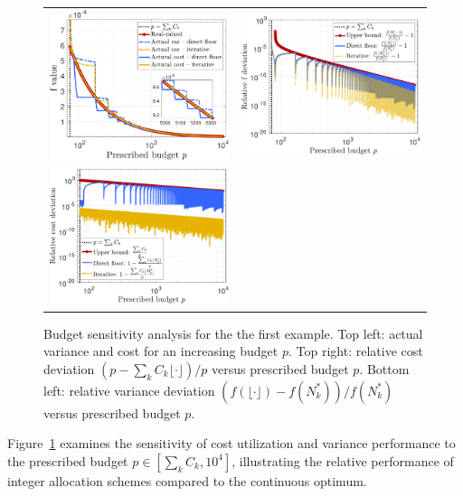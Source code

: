 %
\begin{figure}[!t]\centering
\begin{tabular}{cc}
\includegraphics[width=0.48\linewidth]{./Figures/Eg1_f_Cost.pdf}&
\includegraphics[width=0.48\linewidth]{./Figures/Eg1_f.pdf}\\
\includegraphics[width=0.48\linewidth]{./Figures/Eg1_Cost.pdf} 
\end{tabular}
\caption{
Budget sensitivity analysis for the the first example. Top left: actual variance and cost for an increasing budget $p$. Top right: relative cost deviation $(p - \sum_k C_k \lfloor \cdot \rfloor)/p$ versus prescribed budget $p$. Bottom left: relative variance deviation $(f(\lfloor \cdot \rfloor) - f(N_k^*))/f(N_k^*)$ versus prescribed budget $p$. 
} 
\label{fig:Eg1} 
\end{figure}
%

Figure~\ref{fig:Eg1} examines the sensitivity of cost utilization and variance performance to the prescribed budget $p \in [\sum_k C_k, 10^4]$, illustrating the relative performance of integer allocation schemes compared to the continuous optimum.

